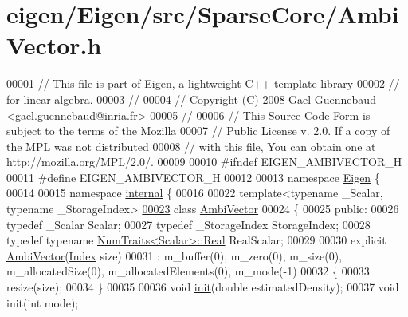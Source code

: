 \hypertarget{eigen_2_eigen_2src_2_sparse_core_2_ambi_vector_8h_source}{}\section{eigen/\+Eigen/src/\+Sparse\+Core/\+Ambi\+Vector.h}
\label{eigen_2_eigen_2src_2_sparse_core_2_ambi_vector_8h_source}

\begin{DoxyCode}
00001 \textcolor{comment}{// This file is part of Eigen, a lightweight C++ template library}
00002 \textcolor{comment}{// for linear algebra.}
00003 \textcolor{comment}{//}
00004 \textcolor{comment}{// Copyright (C) 2008 Gael Guennebaud <gael.guennebaud@inria.fr>}
00005 \textcolor{comment}{//}
00006 \textcolor{comment}{// This Source Code Form is subject to the terms of the Mozilla}
00007 \textcolor{comment}{// Public License v. 2.0. If a copy of the MPL was not distributed}
00008 \textcolor{comment}{// with this file, You can obtain one at http://mozilla.org/MPL/2.0/.}
00009 
00010 \textcolor{preprocessor}{#ifndef EIGEN\_AMBIVECTOR\_H}
00011 \textcolor{preprocessor}{#define EIGEN\_AMBIVECTOR\_H}
00012 
00013 \textcolor{keyword}{namespace }\hyperlink{namespace_eigen}{Eigen} \{ 
00014 
00015 \textcolor{keyword}{namespace }\hyperlink{namespaceinternal}{internal} \{
00016 
00022 \textcolor{keyword}{template}<\textcolor{keyword}{typename} \_Scalar, \textcolor{keyword}{typename} \_StorageIndex>
\hyperlink{class_eigen_1_1internal_1_1_ambi_vector}{00023} \textcolor{keyword}{class }\hyperlink{class_eigen_1_1internal_1_1_ambi_vector}{AmbiVector}
00024 \{
00025   \textcolor{keyword}{public}:
00026     \textcolor{keyword}{typedef} \_Scalar Scalar;
00027     \textcolor{keyword}{typedef} \_StorageIndex StorageIndex;
00028     \textcolor{keyword}{typedef} \textcolor{keyword}{typename} \hyperlink{group___core___module_struct_eigen_1_1_num_traits}{NumTraits<Scalar>::Real} RealScalar;
00029 
00030     \textcolor{keyword}{explicit} \hyperlink{class_eigen_1_1internal_1_1_ambi_vector}{AmbiVector}(\hyperlink{namespace_eigen_a62e77e0933482dafde8fe197d9a2cfde}{Index} size)
00031       : m\_buffer(0), m\_zero(0), m\_size(0), m\_allocatedSize(0), m\_allocatedElements(0), m\_mode(-1)
00032     \{
00033       resize(size);
00034     \}
00035 
00036     \textcolor{keywordtype}{void} \hyperlink{structinit}{init}(\textcolor{keywordtype}{double} estimatedDensity);
00037     \textcolor{keywordtype}{void} init(\textcolor{keywordtype}{int} mode);

\end{DoxyCode}

